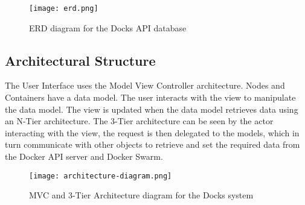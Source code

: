 \documentclass[]{article}
\begin{document}
\begin{figure}[H]
	\centering
	\texttt{[image: erd.png]}
	\caption{ERD diagram for the Docks API database}
\end{figure}

\subsection{Architectural Structure}
The User Interface uses the Model View Controller architecture. Nodes and Containers have a data model. The user interacts with the view to manipulate the data model. The view is updated when the data model retrieves data using an N-Tier architecture. The 3-Tier architecture can be seen by the actor interacting with the view, the request is then delegated to the models, which in turn communicate with other objects to retrieve and set the required data from the Docker API server and Docker Swarm.

\begin{figure}[h]
	\centering
	\texttt{[image: architecture-diagram.png]}
	\caption{MVC and 3-Tier Architecture diagram for the Docks system}
\end{figure}
\end{document}
